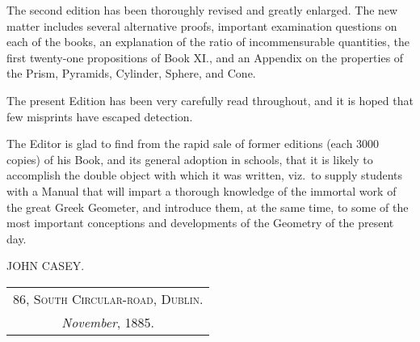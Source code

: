 \documentclass[oneside]{book}
\begin{document}
The second edition has been thoroughly revised
and greatly enlarged. The new matter includes
several alternative proofs, important examination
questions on each of the books, an explanation of
the ratio of incommensurable quantities, the first
twenty-one propositions of Book XI\@., and an
Appendix on the properties of the Prism, Pyramids,
Cylinder, Sphere, and Cone.

The present Edition has been very carefully
read throughout, and it is hoped that few misprints
have escaped detection.

The Editor is glad to find from the rapid sale of
former editions (each 3000 copies) of his Book, and
its general adoption in schools, that it is likely to
accomplish the double object with which it was
written, viz.\ to supply students with a Manual
that will impart a thorough knowledge of the
immortal work of the great Greek Geometer, and
introduce them, at the same time, to some of the
most important conceptions and developments of
the Geometry of the present day.
\bigskip

\begin{flushright}
JOHN CASEY. \mbox\quad
\end{flushright}
\bigskip

\noindent
\begin{tabular}{@{}c@{}}
\textsc{86, South Circular-road, Dublin.}\\
\textit{November}, 1885.
\end{tabular}

\tableofcontents
\end{document}
